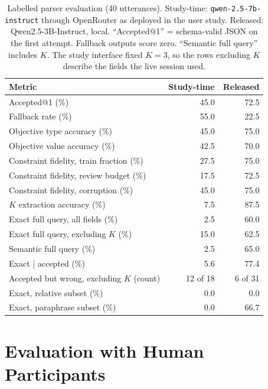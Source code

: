 \documentclass[final,5p,times,twocolumn]{elsarticle}
\begin{document}
\begin{table}[!t]
\centering
\footnotesize
\caption{Labelled parser evaluation (40 utterances). Study-time:
\texttt{qwen-2.5-7b-instruct} through OpenRouter as deployed in the user study. Released:
Qwen2.5-3B-Instruct, local. ``Accepted@1'' = schema-valid JSON on the
first attempt. Fallback outputs score zero. ``Semantic full query'' includes $K$. The study interface fixed $K = 3$, so the rows excluding $K$ describe the fields the live session used.}
\label{tab:parser-eval}
\setlength{\tabcolsep}{2.5pt}
\begin{tabular}{@{}p{}rr@{}}
\toprule
Metric & Study-time & Released \\
\midrule
Accepted@1 (\%)                          & 45.0 & 72.5 \\
Fallback rate (\%)                       & 55.0 & 22.5 \\
Objective type accuracy (\%)             & 45.0 & 75.0 \\
Objective value accuracy (\%)            & 42.5 & 70.0 \\
Constraint fidelity, train fraction (\%) & 27.5 & 75.0 \\
Constraint fidelity, review budget (\%)  & 17.5 & 72.5 \\
Constraint fidelity, corruption (\%)     & 45.0 & 75.0 \\
$K$ extraction accuracy (\%)             & 7.5  & 87.5 \\
Exact full query, all fields (\%)         & 2.5  & 60.0 \\
Exact full query, excluding $K$ (\%)      & 15.0 & 62.5 \\
Semantic full query (\%)                 & 2.5  & 65.0 \\
Exact $\mid$ accepted (\%)               & 5.6  & 77.4 \\
Accepted but wrong, excluding $K$ (count) & 12 of 18 & 6 of 31 \\
Exact, relative subset (\%)              & 0.0  & 0.0 \\
Exact, paraphrase subset (\%)            & 0.0  & 66.7 \\
\bottomrule
\end{tabular}
\end{table}

\section{Evaluation with Human Participants}
\label{sec:user-study}
\end{document}
